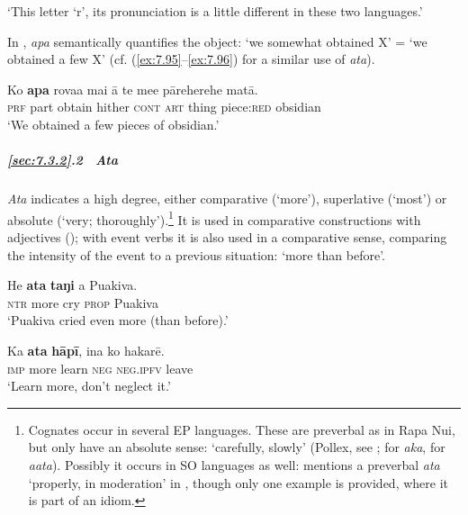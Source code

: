 \glt
‘This letter ‘r’, its pronunciation is a little different in these two languages.’ \textstyleExampleref{[R616.145]} 
\z

In , \textit{{\ꞌ}apa} semantically quantifies the object: ‘we somewhat obtained X’ = ‘we obtained a few X’ (cf. (\ref{ex:7.95}–\ref{ex:7.96}) for a similar use of \textit{{\ꞌ}ata}).

\ea\label{ex:7.91}
\gll Ko \textbf{{\ꞌ}apa} rova{\ꞌ}a mai {\ꞌ}ā te me{\ꞌ}e pāreherehe matā. \\
\textsc{prf} part obtain hither \textsc{cont} \textsc{art} thing piece:\textsc{red} obsidian \\

\glt 
‘We obtained a few pieces of obsidian.’ \textstyleExampleref{[R629.030]} 
\z

\subparagraph{\ref{sec:7.3.2}.2~ \textit{{\ꞌ}Ata}} \textit{{\ꞌ}Ata} indicates a high degree, either comparative (‘more’), superlative (‘most’) or absolute (‘very; thoroughly’).\footnote{\label{fn:343}Cognates occur in several EP languages. These are preverbal as in Rapa Nui, but only have an absolute sense: ‘carefully, slowly’ (Pollex, see \citealt{GreenhillClark2011}; \citealt[74]{ElbertPukui1979} for  \textit{aka}, \citealt[92]{Bauer1993} for  \textit{aata}). Possibly it occurs in SO languages as well: \citet[188]{Besnier2000} mentions a preverbal  \textit{ata} ‘properly, in moderation’ in , though only one example is provided, where it is part of an idiom.} It is used in comparative constructions with adjectives (); with event verbs it is also used in a comparative sense, comparing the intensity of the event to a previous situation: ‘more than before’.

\ea\label{ex:7.92}
\gll He \textbf{{\ꞌ}ata} \textbf{taŋi} a Puakiva. \\
\textsc{ntr} more cry \textsc{prop} Puakiva \\

\glt 
‘Puakiva cried even more (than before).’ \textstyleExampleref{[R229.183]} 
\z

\ea\label{ex:7.93}
\gll Ka \textbf{{\ꞌ}ata} \textbf{hāpī}, {\ꞌ}ina ko hakarē. \\
\textsc{imp} more learn \textsc{neg} \textsc{neg.ipfv} leave \\

\glt
‘Learn more, don’t neglect it.’ \textstyleExampleref{[R242.093]} 
\z

